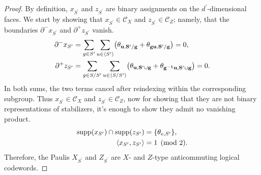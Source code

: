 \begin{proof}
By definition, $x_{S^{\prime}}$ and $z_{S^{\prime}}$ are binary assignments on the $d^{\prime}$-dimensional faces. We start by showing that $x_{S^{\prime}} \in \mathcal{C}_{X}$ and $z_{S^{\prime}} \in \mathcal{C}_{Z}$; namely, that the boundaries $\partial^{-}x_{S^{\prime}}$ and $\partial^{+}z_{S^{\prime}}$ vanish.
\begin{align*}
  \partial^- x_{S'}
  &=\sum_{g\in S'}\sum_{u\in\langle S'\rangle}
    \bigl(\mathbf{\theta_{u ,S'/g} }+\mathbf{\theta_{gu ,S'/g} }\bigr)=0,\\
  \partial^+ z_{S'}
  &=\sum_{g\in S/S'}\sum_{u\in\langle S/S'\rangle}
    \bigl(\mathbf{\theta_{u ,S'\cup g} }+\mathbf{\theta_{g^{-1}u ,S'\cup g} }\bigr)=0.
\end{align*}
In both sums, the two terms cancel after reindexing within the corresponding subgroup.
Thus $x_{S^{\prime}} \in \mathcal{C}_{X}$ and $z_{S^{\prime}}\in \mathcal{C}_{Z}$, now for showing that they are not binary representations of stabilizers, it's enough to show they admit no vanishing product.  
\begin{equation*}
  \begin{split}
    \operatorname{supp}(x_{S'})\cap\operatorname{supp}(z_{S'})
    &=\{\theta_{e ,S'}\},\\
    \langle x_{S'},z_{S'}\rangle&=1\pmod 2.
  \end{split}
\end{equation*}
Therefore, the Paulis $X_{S^{\prime}}$ and $Z_{S^{\prime}}$ are $X$- and $Z$-type anticommuting logical codewords.
\end{proof}



